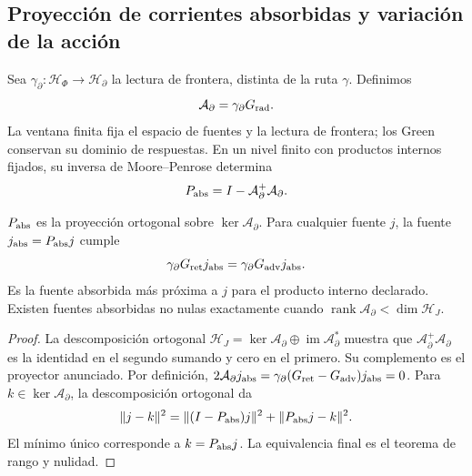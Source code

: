 \subsection{Proyección de corrientes absorbidas y variación de la acción}
\label{vii:subsec:proyeccion-absorcion}

Sea \(\gamma_\partial:\mathcal H_\Phi\to\mathcal H_\partial\)
la lectura de frontera, distinta de la ruta \(\gamma\). Definimos
\[
 \mathcal A_\partial=\gamma_\partial G_{\rm rad}.
\]
La ventana finita fija el espacio de fuentes y la lectura de frontera;
los Green conservan su dominio de respuestas. En un nivel finito con
productos internos fijados, su inversa de
Moore--Penrose determina
\begin{equation}
 P_{\rm abs}=I-\mathcal A_\partial^+\mathcal A_\partial.
 \label{vii:eq:proyector-absorcion}
\end{equation}

\begin{theorem}
\label{vii:thm:proyeccion-absorcion}
\(P_{\rm abs}\) es la proyección ortogonal sobre
\(\ker\mathcal A_\partial\). Para cualquier fuente \(j\), la fuente
\(j_{\rm abs}=P_{\rm abs}j\) cumple
\begin{equation}
 \gamma_\partial G_{\rm ret}j_{\rm abs}
 =\gamma_\partial G_{\rm adv}j_{\rm abs}.
 \label{vii:eq:igualdad-borde-absorbido}
\end{equation}
Es la fuente absorbida más próxima a \(j\) para el producto interno
declarado. Existen fuentes absorbidas no nulas exactamente cuando
\(\operatorname{rank}\mathcal A_\partial<\dim\mathcal H_J\).
\end{theorem}
\begin{proof}
La descomposición ortogonal
\(\mathcal H_J=\ker\mathcal A_\partial\oplus
 \operatorname{im}\mathcal A_\partial^*\) muestra que
\(\mathcal A_\partial^+\mathcal A_\partial\) es la identidad
en el segundo sumando y cero en el primero. Su complemento es el
proyector anunciado. Por definición,
\(2\mathcal A_\partial j_{\rm abs}
 =\gamma_\partial(G_{\rm ret}-G_{\rm adv})j_{\rm abs}=0\).
Para \(k\in\ker\mathcal A_\partial\), la descomposición ortogonal da
\[
 \|j-k\|^2=\|(I-P_{\rm abs})j\|^2+\|P_{\rm abs}j-k\|^2.
\]
El mínimo único corresponde a \(k=P_{\rm abs}j\).
La equivalencia final es el teorema de rango y nulidad.
\end{proof}

